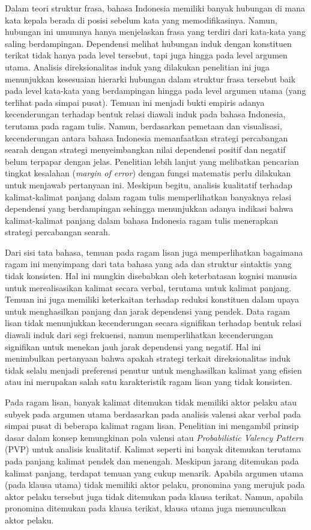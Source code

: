 Dalam teori struktur frasa, bahasa Indonesia memiliki banyak hubungan di mana kata kepala berada di posisi sebelum kata yang memodifikasinya. Namun, hubungan ini umumnya hanya menjelaskan frasa yang terdiri dari kata-kata yang saling berdampingan. Dependensi melihat hubungan induk dengan konstituen terikat tidak hanya pada level tersebut, tapi juga hingga pada level argumen utama. Analisis direksionalitas induk yang dilakukan penelitian ini juga menunjukkan kesesuaian hierarki hubungan dalam struktur frasa tersebut baik pada level kata-kata yang berdampingan hingga pada level argumen utama (yang terlihat pada simpai pusat). Temuan ini menjadi bukti empiris adanya kecenderungan terhadap bentuk relasi diawali induk pada bahasa Indonesia, terutama pada ragam tulis. Namun, berdasarkan pemetaan dan visualisasi, kecenderungan antara bahasa Indonesia memanfaatkan strategi percabangan searah dengan strategi menyeimbangkan nilai dependensi positif dan negatif belum terpapar dengan jelas. Penelitian lebih lanjut yang melibatkan pencarian tingkat kesalahan (\textit{margin of error}) dengan fungsi matematis perlu dilakukan untuk menjawab pertanyaan ini. Meskipun begitu, analisis kualitatif terhadap kalimat-kalimat panjang dalam ragam tulis memperlihatkan banyaknya relasi dependensi yang berdampingan sehingga menunjukkan adanya indikasi bahwa kalimat-kalimat panjang dalam bahasa Indonesia ragam tulis menerapkan strategi percabangan searah.

Dari sisi tata bahasa, temuan pada ragam lisan juga memperlihatkan bagaimana ragam ini menyimpang dari tata bahasa yang ada dan struktur sintaktis yang tidak konsisten. Hal ini mungkin disebabkan oleh keterbatasan kognisi manusia untuk merealisasikan kalimat secara verbal, terutama untuk kalimat panjang. Temuan ini juga memiliki keterkaitan terhadap reduksi konstituen dalam upaya untuk menghasilkan panjang dan jarak dependensi yang pendek. Data ragam lisan tidak menunjukkan kecenderungan secara signifikan terhadap bentuk relasi diawali induk dari segi frekuensi, namun memperlihatkan kecenderungan signifikan untuk menekan jauh jarak dependensi yang negatif. Hal ini menimbulkan pertanyaan bahwa apakah strategi terkait direksionalitas induk tidak selalu menjadi preferensi penutur untuk menghasilkan kalimat yang efisien atau ini merupakan salah satu karakteristik ragam lisan yang tidak konsisten.

Pada ragam lisan, banyak kalimat ditemukan tidak memiliki aktor pelaku atau subyek pada argumen utama berdasarkan pada analisis valensi akar verbal pada simpai pusat di beberapa kalimat ragam lisan. Penelitian ini mengambil prinsip dasar dalam konsep kemungkinan pola valensi atau \textit{Probabilistic Valency Pattern} (PVP) \citep{liu2006syntactic} untuk analisis kualitatif. Kalimat seperti ini banyak ditemukan terutama pada panjang kalimat pendek dan menengah. Meskipun jarang ditemukan pada kalimat panjang, terdapat temuan yang cukup menarik. Apabila argumen utama (pada klausa utama) tidak memiliki aktor pelaku, pronomina yang merujuk pada aktor pelaku tersebut juga tidak ditemukan pada klausa terikat. Namun, apabila pronomina ditemukan pada klausa terikat, klausa utama juga memunculkan aktor pelaku. 

